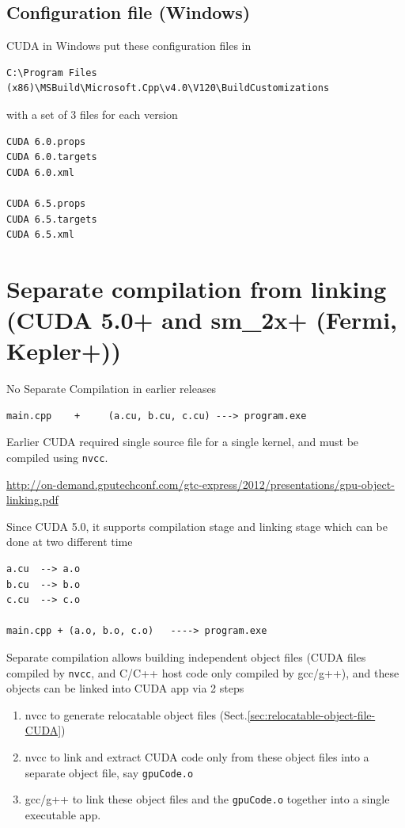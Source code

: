 \subsection{Configuration file (Windows)}

CUDA in Windows put these configuration files in 
\begin{verbatim}
C:\Program Files (x86)\MSBuild\Microsoft.Cpp\v4.0\V120\BuildCustomizations
\end{verbatim}

with a set of 3 files for each version
\begin{verbatim}
CUDA 6.0.props
CUDA 6.0.targets
CUDA 6.0.xml

CUDA 6.5.props
CUDA 6.5.targets
CUDA 6.5.xml
\end{verbatim}

\section{Separate compilation from linking (CUDA 5.0+ and sm\_2x+ (Fermi, Kepler+))}

No Separate Compilation in earlier releases
\begin{verbatim}
main.cpp    +     (a.cu, b.cu, c.cu) ---> program.exe
\end{verbatim}
Earlier CUDA required single source file for a single kernel, and must be compiled using \verb!nvcc!.

\url{http://on-demand.gputechconf.com/gtc-express/2012/presentations/gpu-object-linking.pdf}

Since CUDA 5.0, it supports compilation stage and linking stage which can be done at two different time
\begin{verbatim}
a.cu  --> a.o
b.cu  --> b.o
c.cu  --> c.o

main.cpp + (a.o, b.o, c.o)   ----> program.exe
\end{verbatim}
Separate compilation allows building independent object files (CUDA files compiled by \verb!nvcc!, and C/C++ host code only
compiled by gcc/g++), and these objects can be linked into CUDA app via 2 steps
\begin{enumerate}
  \item nvcc to generate relocatable object files (Sect.\ref{sec:relocatable-object-file-CUDA})
  \item nvcc to link and extract CUDA code only from these object files into a separate object file, say \verb!gpuCode.o!
  \item gcc/g++ to link these object files and the \verb!gpuCode.o! together into a single executable app.
\end{enumerate}

